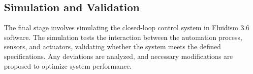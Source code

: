 \subsection{Simulation and Validation} \label{sec:Simulation_and_Validation}

The final stage involves simulating the closed-loop control system in Fluidism 3.6 software. 
The simulation tests the interaction between the automation process, sensors, and actuators, 
validating whether the system meets the defined specifications. Any deviations are analyzed, 
and necessary modifications are proposed to optimize system performance.

